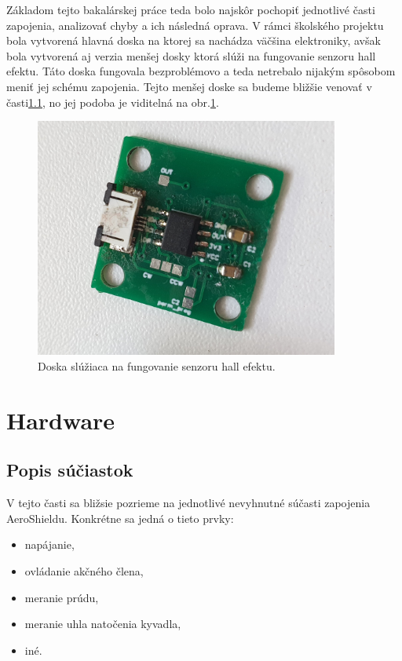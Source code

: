 Základom tejto bakalárskej práce teda bolo najskôr pochopiť jednotlivé časti zapojenia, analizovať chyby a ich následná oprava. V rámci školského projektu bola vytvorená hlavná doska na ktorej sa nachádza väčšina elektroniky, avšak bola vytvorená aj verzia menšej dosky ktorá slúži na fungovanie senzoru hall efektu. Táto doska fungovala bezproblémovo a teda netrebalo nijakým spôsobom meniť jej schému zapojenia. Tejto menšej doske sa budeme bližšie venovať v časti\ref{}, no jej podoba je viditelná na obr.\ref{OBRAZOK 2.1.2}.
 
 \begin{figure}[!tbh]
\centering
\includegraphics[width=100mm]{obr/breakout.jpg}
\caption{Doska slúžiaca na fungovanie senzoru hall efektu.}\label{OBRAZOK 2.1.2}
\end{figure}

\vspace{3cm}


\section{Hardware}
\subsection{Popis súčiastok}

V tejto časti sa bližsie pozrieme na jednotlivé nevyhnutné súčasti zapojenia AeroShieldu. Konkrétne sa jedná o tieto prvky:
\begin{itemize}
\item napájanie,
\item ovládanie akčného člena,
\item meranie prúdu,
\item meranie uhla natočenia kyvadla,
\item iné.
\end{itemize}


